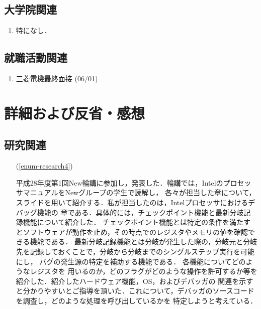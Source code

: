 \documentclass[fleqn, 12pt]{extarticle}
\begin{document}
    \subsection{大学院関連}
    \label{sec2-3}
    \begin{enumerate}

        \item 特になし．
            \hfill
            \label{enum-univ1}

    \end{enumerate}

    \subsection{就職活動関連}
    \label{sec2-3}
    \begin{enumerate}

        \item 三菱電機最終面接
            \hfill
            \label{enum-syukatsu}
            (06/01)

    \end{enumerate}

    \section{詳細および反省・感想}
    \label{sec-3}

    \subsection{研究関連}
    \label{sec-3-2}

    \begin{itemize}

        \item[(\ref{enum-research4})]
            \begin{spacing}{1.2}
                平成28年度第1回New輪講に参加し，発表した．輪講では，IntelのプロセッサマニュアルをNewグループの学生で読解し，
                各々が担当した章について，スライドを用いて紹介する．私が担当したのは，Intelプロセッサにおけるデバッグ機能の
                章である．具体的には，チェックポイント機能と最新分岐記録機能について紹介した．
                チェックポイント機能とは特定の条件を満たすとソフトウェアが動作を止め，その時点でのレジスタやメモリの値を確認できる機能である．
                最新分岐記録機能とは分岐が発生した際の，分岐元と分岐先を記録しておくことで，分岐から分岐までのシングルステップ実行を可能にし，
                バグの発生源の特定を補助する機能である．
                各機能についてどのようなレジスタを
                用いるのか，どのフラグがどのような操作を許可するか等を紹介した．紹介したハードウェア機能，OS，およびデバッガの
                関連を示すと分かりやすいとご指導を頂いた．これについて，デバッガのソースコードを調査し，どのような処理を呼び出しているかを
                特定しようと考えている．
            \end{spacing}

    \end{itemize}
\end{document}
